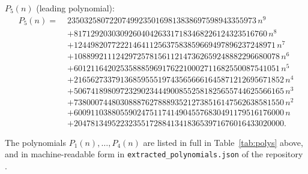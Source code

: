 \documentclass[11pt, a4paper]{article}
\begin{document}
\medskip\noindent
\textbf{$P_5(n)$} (leading polynomial):
\begin{align*}
  P_5(n) =\; &
    235032580722074992350169813838697598943355973\,n^9 \\
  &{+}8171292030309260404263317183468226124323516760\,n^8 \\
  &{+}124498207722214641125637583859669497896237248971\,n^7 \\
  &{+}1088992111242972578156112147362659248882296680078\,n^6 \\
  &{+}6012116420253588859691762210002711682550087541051\,n^5 \\
  &{+}21656273379136859555197435656661645871212695671852\,n^4 \\
  &{+}50674189809723290234449008552581825655744625566165\,n^3 \\
  &{+}73800074480308887627888935212738516147562638581550\,n^2 \\
  &{+}60091103880559024751174149045576830491179516176000\,n \\
  &{+}20478134952232355172884134183653971676016433020000.
\end{align*}

\medskip\noindent
The polynomials $P_1(n),\dots,P_4(n)$ are listed in full in
Table~\ref{tab:polys} above, and in machine-readable form in
\texttt{extracted\_polynomials.json} of the repository \cite{repo}.
\end{document}
